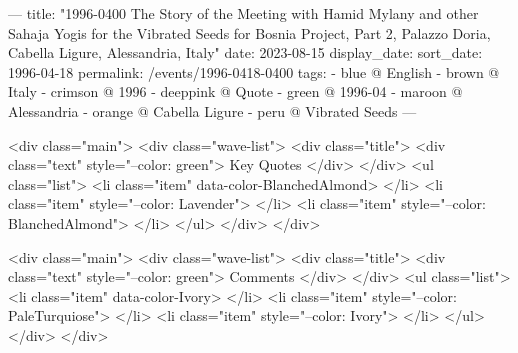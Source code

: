 ---
title: "1996-0400 The Story of the Meeting with Hamid Mylany and other Sahaja Yogis for the Vibrated Seeds for Bosnia Project, Part 2, Palazzo Doria, Cabella Ligure, Alessandria, Italy"
date: 2023-08-15
display_date: 
sort_date: 1996-04-18
permalink: /events/1996-0418-0400
tags:
  - blue @ English
  - brown @ Italy
  - crimson @ 1996
  - deeppink @ Quote
  - green @ 1996-04
  - maroon @ Alessandria
  - orange @ Cabella Ligure
  - peru @ Vibrated Seeds
---

<div class="main">
  <div class="wave-list">
    <div class="title">
      <div class="text" style="--color: green">
        Key Quotes
      </div>
    </div>
    <ul class="list">
        <li class="item" data-color-BlanchedAlmond>
        </li>
        <li class="item" style="--color: Lavender">
        </li>
        <li class="item" style="--color: BlanchedAlmond">
        </li>
      </ul>
  </div>
</div>

<div class="main">
  <div class="wave-list">
    <div class="title">
      <div class="text" style="--color: green">
        Comments
      </div>
    </div>
    <ul class="list">
        <li class="item" data-color-Ivory>
        </li>
        <li class="item" style="--color: PaleTurquiose">
        </li>
        <li class="item" style="--color: Ivory">
        </li>
      </ul>
  </div>
</div>